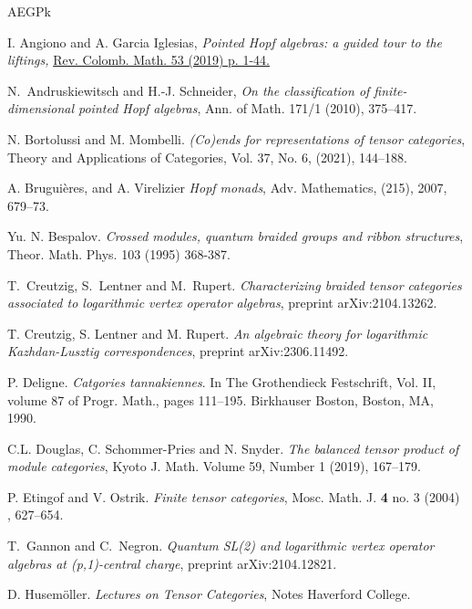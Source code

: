 \documentclass[11pt]{amsart}
\renewcommand{\_}[1]{\mbox{$_{\left( #1 \right)}$}}
\theoremstyle{plain}
\numberwithin{equation}{section}
\theoremstyle{definition}
\theoremstyle{remark}
\theoremstyle{introTheorems}
\begin{document}
\begin{thebibliography}{AEGPk}


 {\sc I. Angiono} and {\sc  A. Garcia Iglesias,} \emph{ Pointed Hopf algebras: a guided tour to the liftings,} \href{https://doi.org/10.15446/recolma.v53nsupl.83958}{Rev. Colomb. Math. 53 (2019) p. 1-44.}  

 {\sc N.~Andruskiewitsch} and {\sc  H.-J. Schneider}, \emph{On the classification of finite-dimensional pointed Hopf algebras}, Ann. of Math. 171/1 (2010), 375--417.

  {\sc N. Bortolussi} and  {\sc M. Mombelli}. 
\emph{(Co)ends for representations of tensor categories}, Theory and Applications of Categories, Vol. 37, No. 6, (2021),  144--188.

  {\sc A. Bruguières,} and  {\sc  A. Virelizier}
\textit{Hopf monads},
Adv. Mathematics,
(215),
2007, 679--73.

    {\sc Yu. N. Bespalov}. \textit{Crossed modules, quantum braided groups and ribbon structures},
    Theor. Math. Phys. 103 (1995)  368-387.

 {\sc T.~Creutzig}, {\sc S.~Lentner} and {\sc M.~Rupert}. \emph{Characterizing braided tensor categories associated to logarithmic vertex operator algebras}, preprint arXiv:2104.13262.

  {\sc T. Creutzig, S. Lentner} and {\sc M. Rupert}. \textit{An algebraic theory for logarithmic Kazhdan-Lusztig correspondences}, preprint arXiv:2306.11492.


 {\sc P. Deligne}. \textit{Catgories tannakiennes}. In The Grothendieck Festschrift, Vol. II, volume 87 of
Progr. Math., pages 111–195. Birkhauser Boston, Boston, MA, 1990.


 {\sc C.L. Douglas}, {\sc C. Schommer-Pries} and {\sc N. Snyder}. \emph{The balanced tensor product of module categories}, Kyoto J. Math. Volume 59, Number 1 (2019), 167--179.

 {\sc P. Etingof} and {\sc V. Ostrik}.
\emph{Finite tensor categories}, Mosc. Math. J. \textbf{4} no. 3 (2004)
, 627--654.

{\sc T.~Gannon} and {\sc C.~Negron}. \emph{Quantum SL(2) and logarithmic vertex operator algebras at (p,1)-central charge}, preprint arXiv:2104.12821. 

 {\sc  D. Husemöller}. \emph{Lectures on Tensor Categories}, Notes Haverford College.


\end{thebibliography}
\end{document}
